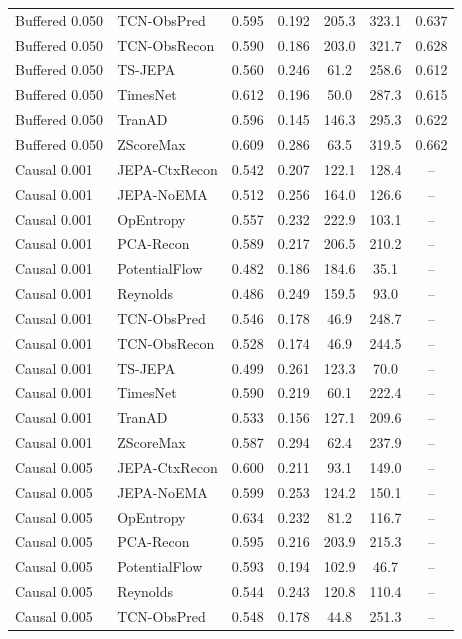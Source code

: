 \begin{table}[t]
\begin{tabular}{@{}llccccc@{}}
Buffered 0.050 & TCN-ObsPred & 0.595 & 0.192 & 205.3 & 323.1 & 0.637 \\
Buffered 0.050 & TCN-ObsRecon & 0.590 & 0.186 & 203.0 & 321.7 & 0.628 \\
Buffered 0.050 & TS-JEPA & 0.560 & 0.246 & 61.2 & 258.6 & 0.612 \\
Buffered 0.050 & TimesNet & 0.612 & 0.196 & 50.0 & 287.3 & 0.615 \\
Buffered 0.050 & TranAD & 0.596 & 0.145 & 146.3 & 295.3 & 0.622 \\
Buffered 0.050 & ZScoreMax & 0.609 & 0.286 & 63.5 & 319.5 & 0.662 \\
Causal 0.001 & JEPA-CtxRecon & 0.542 & 0.207 & 122.1 & 128.4 & -- \\
Causal 0.001 & JEPA-NoEMA & 0.512 & 0.256 & 164.0 & 126.6 & -- \\
Causal 0.001 & OpEntropy & 0.557 & 0.232 & 222.9 & 103.1 & -- \\
Causal 0.001 & PCA-Recon & 0.589 & 0.217 & 206.5 & 210.2 & -- \\
Causal 0.001 & PotentialFlow & 0.482 & 0.186 & 184.6 & 35.1 & -- \\
Causal 0.001 & Reynolds & 0.486 & 0.249 & 159.5 & 93.0 & -- \\
Causal 0.001 & TCN-ObsPred & 0.546 & 0.178 & 46.9 & 248.7 & -- \\
Causal 0.001 & TCN-ObsRecon & 0.528 & 0.174 & 46.9 & 244.5 & -- \\
Causal 0.001 & TS-JEPA & 0.499 & 0.261 & 123.3 & 70.0 & -- \\
Causal 0.001 & TimesNet & 0.590 & 0.219 & 60.1 & 222.4 & -- \\
Causal 0.001 & TranAD & 0.533 & 0.156 & 127.1 & 209.6 & -- \\
Causal 0.001 & ZScoreMax & 0.587 & 0.294 & 62.4 & 237.9 & -- \\
Causal 0.005 & JEPA-CtxRecon & 0.600 & 0.211 & 93.1 & 149.0 & -- \\
Causal 0.005 & JEPA-NoEMA & 0.599 & 0.253 & 124.2 & 150.1 & -- \\
Causal 0.005 & OpEntropy & 0.634 & 0.232 & 81.2 & 116.7 & -- \\
Causal 0.005 & PCA-Recon & 0.595 & 0.216 & 203.9 & 215.3 & -- \\
Causal 0.005 & PotentialFlow & 0.593 & 0.194 & 102.9 & 46.7 & -- \\
Causal 0.005 & Reynolds & 0.544 & 0.243 & 120.8 & 110.4 & -- \\
Causal 0.005 & TCN-ObsPred & 0.548 & 0.178 & 44.8 & 251.3 & -- \\

\end{tabular}
\end{table}

